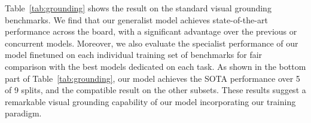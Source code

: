 Table~\ref{tab:grounding} shows the result on the standard visual grounding benchmarks.
We find that our generalist model achieves state-of-the-art performance across the board, with a significant advantage over the previous or concurrent models. Moreover, we also evaluate the specialist performance of our model finetuned on each individual training set of benchmarks for fair comparison with the best models dedicated on each task. As shown in the bottom part of Table~\ref{tab:grounding}, our model achieves the SOTA performance over 5 of 9 splits, and the compatible result on the other subsets. These results suggest a remarkable visual grounding capability of our model incorporating our training paradigm.

























